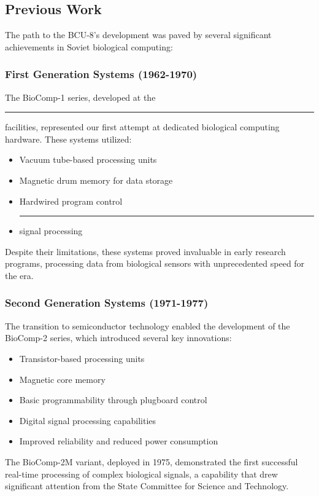 \documentclass[12pt]{article}
\begin{document}
\subsection{Previous Work}
The path to the BCU-8's development was paved by several significant achievements in Soviet biological computing:

\subsubsection{First Generation Systems (1962-1970)}
The BioComp-1 series, developed at the \rule{35mm}{3.5mm} facilities, represented our first attempt at dedicated biological computing hardware. These systems utilized:
\begin{itemize}
    \item Vacuum tube-based processing units
    \item Magnetic drum memory for data storage
    \item Hardwired program control
    \item \rule{45mm}{3.5mm} signal processing
\end{itemize}

Despite their limitations, these systems proved invaluable in early research programs, processing data from biological sensors with unprecedented speed for the era.

\subsubsection{Second Generation Systems (1971-1977)}
The transition to semiconductor technology enabled the development of the BioComp-2 series, which introduced several key innovations:
\begin{itemize}
    \item Transistor-based processing units
    \item Magnetic core memory
    \item Basic programmability through plugboard control
    \item Digital signal processing capabilities
    \item Improved reliability and reduced power consumption
\end{itemize}

The BioComp-2M variant, deployed in 1975, demonstrated the first successful real-time processing of complex biological signals, a capability that drew significant attention from the State Committee for Science and Technology.
\end{document}
